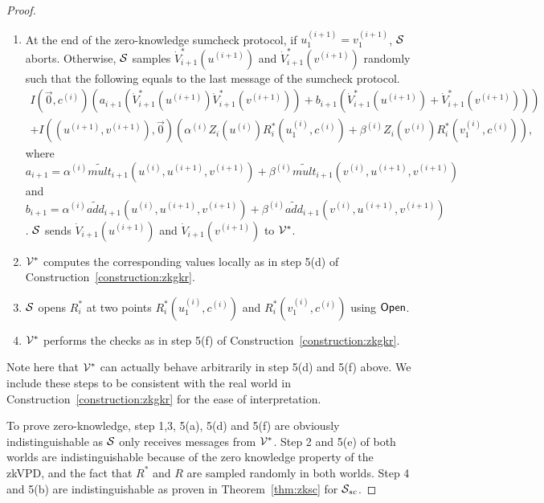 \begin{proof}
\begin{enumerate}
\begin{enumerate}
	\item At the end of the zero-knowledge sumcheck protocol, if $u_1^{(i+1)} = v_1^{(i+1)}$, $\S$ aborts. Otherwise, $\S$ samples $\dot{V}^*_{i+1}(u^{(i+1)})$ and $\dot{V}^*_{i+1}(v^{(i+1)})$ randomly such that the following equals to the last message of the sumcheck protocol.
	\begin{align*}
	I(\vec{0},c^{(i)})(a_{i+1}(\dot{V}^*_{i+1}(u^{(i+1)})\dot{V}^*_{i+1}(v^{(i+1)}))+b_{i+1}(\dot{V}^*_{i+1}(u^{(i+1)})+\dot{V}^*_{i+1}(v^{(i+1)})))\\
	+I((u^{(i+1)},v^{(i+1)}),\vec{0})(\alpha^{(i)}Z_i(u^{(i)})R^*_i(u_1^{(i)}, c^{(i)})+\beta^{(i)}Z_i(v^{(i)})R^*_i(v_1^{(i)}, c^{(i)})),
	\end{align*}
	where $a_{i+1} = \alpha^{(i)}\tilde{mult}_{i+1}(u^{(i)}, u^{(i+1)}, v^{(i+1)})+\beta^{(i)}\tilde{mult}_{i+1}(v^{(i)}, u^{(i+1)}, v^{(i+1)})$ and $b_{i+1} = \alpha^{(i)}\tilde{add}_{i+1}(u^{(i)}, u^{(i+1)}, v^{(i+1)})+\beta^{(i)}\tilde{add}_{i+1}(v^{(i)}, u^{(i+1)}, v^{(i+1)})$. $\S$ sends $\dot{V}_{i+1}(u^{(i+1)})$ and $\dot{V}_{i+1}(v^{(i+1)})$ to $\V^*$.
	
	\item $\V^*$ computes the corresponding values locally as in step 5(d) of Construction~\ref{construction:zkgkr}.
	\item $\S$ opens $R^*_i$ at two points $R^*_i(u_1^{(i)},c^{(i)})$ and $R^*_i(v_1^{(i)},c^{(i)})$ using $\Open$.
	\item $\V^*$ performs the checks as in step 5(f) of Construction~\ref{construction:zkgkr}.
	\end{enumerate}
\end{enumerate} 

Note here that $\V^*$ can actually behave arbitrarily in step 5(d) and 5(f) above. We include these steps to be consistent with the real world in  Construction~\ref{construction:zkgkr} for the ease of interpretation.

To prove zero-knowledge, step 1,3, 5(a), 5(d) and 5(f) are obviously indistinguishable as $\S$ only receives messages from $\V^*$. Step 2 and 5(e) of both worlds are indistinguishable because of the zero knowledge property of the zkVPD, and the fact that $R^*$ and $R$ are sampled randomly in both worlds. Step 4 and 5(b) are indistinguishable as proven in Theorem~\ref{thm:zksc} for $\S_{sc}$.  



\end{proof}
